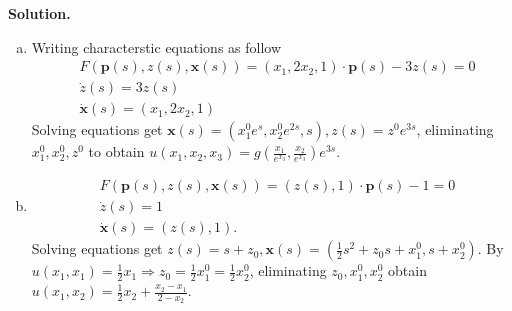 \message{ !name(PDE-hw6-21935004-\unexpanded{谭焱}.tex)}\documentclass[a4paper]{book}
\newenvironment{solution}%
{\noindent\textbf{Solution.}}%
{\qedhere}
\numberwithin{equation}{chapter}
\theoremstyle{definition}
\begin{document}
\begin{solution}
  \begin{enumerate} [(a)]
  \item Writing characterstic equations as follow
    \begin{align*}
      &F(\mathbf{p}(s), z(s), \mathbf{x}(s)) = (x_1,2x_2,1) \cdot \mathbf{p}(s) - 3 z(s) = 0 \\
      &\dot{z}(s) = 3 z(s) \\
      &\dot{\mathbf{x}}(s) = (x_1, 2 x_2, 1) 
    \end{align*}
    Solving equations get $\mathbf{x}(s) = (x^0_1e^{s},x^0_2e^{2s},s), z(s) = z^0 e^{3s}$, eliminating $x^0_1,x^0_2,z^0$ to obtain $u(x_1,x_2,x_3) = g(\frac{x_1}{e^{x_3}}, \frac{x_2}{e^{x_3}}) e^{3s}$.

    \item
      \begin{align*}
        &F(\mathbf{p}(s), z(s), \mathbf{x}(s)) = (z(s),1) \cdot \mathbf{p}(s) - 1 = 0 \\
        &\dot{z}(s) = 1 \\
        &\dot{\mathbf{x}}(s) = (z(s),1).
      \end{align*}
      Solving equations get $z(s) = s + z_0, \mathbf{x}(s) = (\frac{1}{2}s^2 + z_0 s + x^0_1, s + x^0_2)$. By $u(x_1,x_1) = \frac{1}{2}x_1 \Longrightarrow z_0 = \frac{1}{2}x^0_1 = \frac{1}{2}x^0_2$, eliminating $z_0,x^0_1,x^0_2$ obtain $u(x_1,x_2) = \frac{1}{2}x_2 + \frac{x_2 - x_1}{2 - x_2}$.
  \end{enumerate}
\end{solution}
\end{document}
